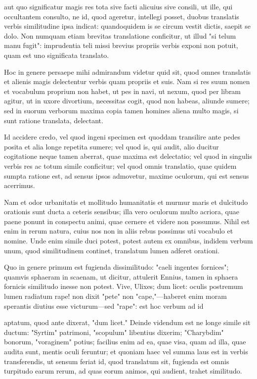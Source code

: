  aut quo significatur magis res tota sive facti alicuius sive consili, ut ille, qui occultantem consulto, ne id, quod ageretur, intellegi posset, duobus translatis verbis similitudine ipsa indicat: quandoquidem is se circum vestit dictis, saepit se dolo. Non numquam etiam brevitas translatione conficitur, ut illud "si telum manu fugit": imprudentia teli missi brevius propriis verbis exponi non potuit, quam est uno significata translato.

 Hoc in genere persaepe mihi admirandum videtur quid sit, quod omnes translatis et alienis magis delectentur verbis quam propriis et suis. Nam si res suum nomen et vocabulum proprium non habet, ut pes in navi, ut nexum, quod per libram agitur, ut in uxore divortium, necessitas cogit, quod non habeas, aliunde sumere; sed in suorum verborum maxima copia tamen homines aliena multo magis, si sunt ratione translata, delectant.

 Id accidere credo, vel quod ingeni specimen est quoddam transilire ante pedes posita et alia longe repetita sumere; vel quod is, qui audit, alio ducitur cogitatione neque tamen aberrat, quae maxima est delectatio; vel quod in singulis verbis res ac totum simile conficitur; vel quod omnis translatio, quae quidem sumpta ratione est, ad sensus ipsos admovetur, maxime oculorum, qui est sensus acerrimus.

 Nam et odor urbanitatis et mollitudo humanitatis et murmur maris et dulcitudo orationis sunt ducta a ceteris sensibus; illa vero oculorum multo acriora, quae paene ponunt in conspectu animi, quae cernere et videre non possumus. Nihil est enim in rerum natura, cuius nos non in aliis rebus possimus uti vocabulo et nomine. Unde enim simile duci potest, potest autem ex omnibus, indidem verbum unum, quod similitudinem continet, translatum lumen adferet orationi.

 Quo in genere primum est fugienda dissimilitudo: "caeli ingentes fornices"; quamvis sphaeram in scaenam, ut dicitur, attulerit Ennius, tamen in sphaera fornicis similitudo inesse non potest. Vive, Ulixes; dum licet: oculis postremum lumen radiatum rape! non dixit "pete" non "cape,"—haberet enim moram sperantis diutius esse victurum—sed "rape": est hoc verbum ad id

 aptatum, quod ante dixerat, "dum licet." Deinde videndum est ne longe simile sit ductum: "Syrtim" patrimoni, "scopulum" libentius dixerim; "Charybdim" bonorum, "voraginem" potius; facilius enim ad ea, quae visa, quam ad illa, quae audita sunt, mentis oculi feruntur; et quoniam haec vel summa laus est in verbis transferendis, ut sensum feriat id, quod translatum sit, fugienda est omnis turpitudo earum rerum, ad quas eorum animos, qui audient, trahet similitudo.

